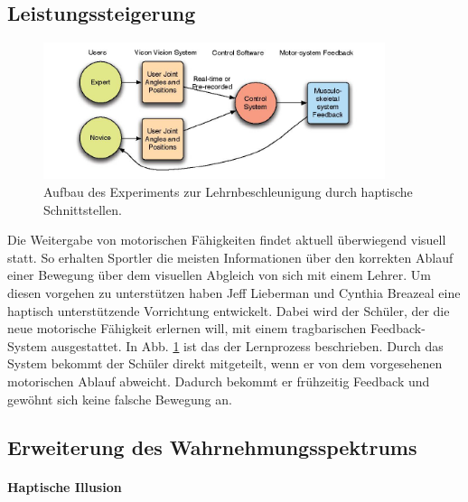 \documentclass{llncs}					%
\begin{document}
\subsection{Leistungssteigerung}

\begin{figure}[htbp]
	\begin{center}
		\includegraphics[width = 10cm]{Grafiken/17-Lehrnbeschleunigung-Versuchsaufbau.png}
		\caption{Aufbau des Experiments zur Lehrnbeschleunigung durch haptische Schnittstellen\cite{lieberman2007development}.}
		\label{17-Lehrnbeschleunigung-Versuchsaufbau}
	\end{center}
\end{figure}

Die Weitergabe von motorischen Fähigkeiten findet aktuell überwiegend visuell statt. So erhalten Sportler die meisten Informationen über den korrekten Ablauf einer Bewegung über dem visuellen Abgleich von sich mit einem Lehrer. Um diesen vorgehen zu unterstützen haben Jeff Lieberman und Cynthia Breazeal\cite{lieberman2007development} eine haptisch unterstützende Vorrichtung entwickelt. Dabei wird der Schüler, der die neue motorische Fähigkeit erlernen will, mit einem tragbarischen Feedback-System ausgestattet. In Abb. \ref{17-Lehrnbeschleunigung-Versuchsaufbau} ist das der Lernprozess beschrieben.
Durch das System bekommt der Schüler direkt mitgeteilt, wenn er von dem vorgesehenen motorischen Ablauf abweicht. Dadurch bekommt er frühzeitig Feedback und gewöhnt sich keine falsche Bewegung an.

\subsection{Erweiterung des Wahrnehmungsspektrums}

\paragraph{Haptische Illusion}
\end{document}
